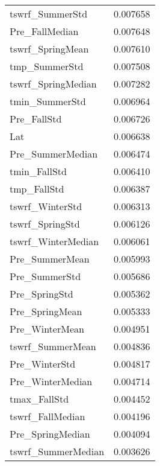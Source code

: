 \begin{tabular}{lr}
tswrf_SummerStd & 0.007658 \\
Pre_FallMedian & 0.007648 \\
tswrf_SpringMean & 0.007610 \\
tmp_SummerStd & 0.007508 \\
tswrf_SpringMedian & 0.007282 \\
tmin_SummerStd & 0.006964 \\
Pre_FallStd & 0.006726 \\
Lat & 0.006638 \\
Pre_SummerMedian & 0.006474 \\
tmin_FallStd & 0.006410 \\
tmp_FallStd & 0.006387 \\
tswrf_WinterStd & 0.006313 \\
tswrf_SpringStd & 0.006126 \\
tswrf_WinterMedian & 0.006061 \\
Pre_SummerMean & 0.005993 \\
Pre_SummerStd & 0.005686 \\
Pre_SpringStd & 0.005362 \\
Pre_SpringMean & 0.005333 \\
Pre_WinterMean & 0.004951 \\
tswrf_SummerMean & 0.004836 \\
Pre_WinterStd & 0.004817 \\
Pre_WinterMedian & 0.004714 \\
tmax_FallStd & 0.004452 \\
tswrf_FallMedian & 0.004196 \\
Pre_SpringMedian & 0.004094 \\
tswrf_SummerMedian & 0.003626 \\
\bottomrule
\end{tabular}
